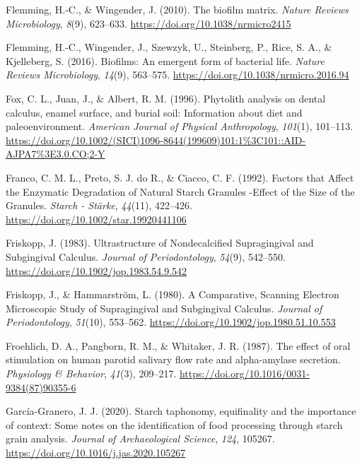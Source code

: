 \documentclass[
  letterpaper,
]{book}
\newlength{\cslhangindent}
\newlength{\cslentryspacingunit} %
\newenvironment{CSLReferences}[2] %
 {%
  \setlength{\parindent}{0pt}
  \ifodd #1
  \let\oldpar\par
  \def\par{\hangindent=\cslhangindent\oldpar}
  \fi
  \setlength{\parskip}{#2\cslentryspacingunit}
 }%
 {}
\begin{document}
\begin{CSLReferences}{1}{0}
\leavevmode{}%
Flemming, H.-C., \& Wingender, J. (2010). The biofilm matrix.
\emph{Nature Reviews Microbiology}, \emph{8}(9), 623--633.
\url{https://doi.org/10.1038/nrmicro2415}

\leavevmode{}%
Flemming, H.-C., Wingender, J., Szewzyk, U., Steinberg, P., Rice, S. A.,
\& Kjelleberg, S. (2016). Biofilms: An emergent form of bacterial life.
\emph{Nature Reviews Microbiology}, \emph{14}(9), 563--575.
\url{https://doi.org/10.1038/nrmicro.2016.94}

\leavevmode{}%
Fox, C. L., Juan, J., \& Albert, R. M. (1996). Phytolith analysis on
dental calculus, enamel surface, and burial soil: {Information} about
diet and paleoenvironment. \emph{American Journal of Physical
Anthropology}, \emph{101}(1), 101--113.
\url{https://doi.org/10.1002/(SICI)1096-8644(199609)101:1\%3C101::AID-AJPA7\%3E3.0.CO;2-Y}

\leavevmode{}%
Franco, C. M. L., Preto, S. J. do R., \& Ciacco, C. F. (1992). Factors
that {Affect} the {Enzymatic Degradation} of {Natural Starch Granules}
-{Effect} of the {Size} of the {Granules}. \emph{Starch - Stärke},
\emph{44}(11), 422--426. \url{https://doi.org/10.1002/star.19920441106}

\leavevmode{}%
Friskopp, J. (1983). Ultrastructure of {Nondecalcified Supragingival}
and {Subgingival Calculus}. \emph{Journal of Periodontology},
\emph{54}(9), 542--550. \url{https://doi.org/10.1902/jop.1983.54.9.542}

\leavevmode{}%
Friskopp, J., \& Hammarström, L. (1980). A {Comparative}, {Scanning
Electron Microscopic Study} of {Supragingival} and {Subgingival
Calculus}. \emph{Journal of Periodontology}, \emph{51}(10), 553--562.
\url{https://doi.org/10.1902/jop.1980.51.10.553}

\leavevmode{}%
Froehlich, D. A., Pangborn, R. M., \& Whitaker, J. R. (1987). The effect
of oral stimulation on human parotid salivary flow rate and
alpha-amylase secretion. \emph{Physiology \& Behavior}, \emph{41}(3),
209--217. \url{https://doi.org/10.1016/0031-9384(87)90355-6}

\leavevmode{}%
García-Granero, J. J. (2020). Starch taphonomy, equifinality and the
importance of context: {Some} notes on the identification of food
processing through starch grain analysis. \emph{Journal of
Archaeological Science}, \emph{124}, 105267.
\url{https://doi.org/10.1016/j.jas.2020.105267}


\end{CSLReferences}
\end{document}
